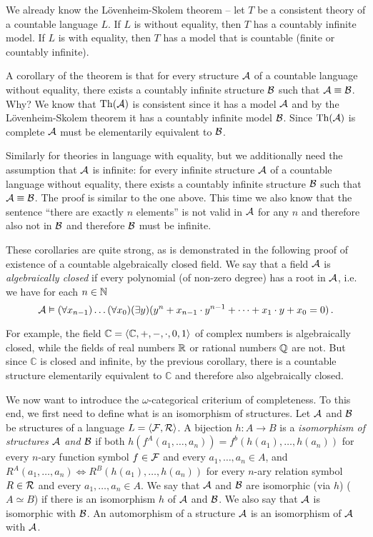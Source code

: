 We already know the Lövenheim-Skolem theorem -- let $T$ be a consistent theory of a countable language $L$. If $L$ is without equality, then $T$ has a countably infinite model. If $L$ is with equality, then $T$ has a model that is countable (finite or countably infinite). 

A corollary of the theorem is that for every structure $\mathcal{A}$ of a countable language without equality, there exists a countably infinite structure $\mathcal{B}$ such that $\mathcal{A} \equiv \mathcal{B}$. Why? We know that $\operatorname{Th}(\mathcal{A})$ is consistent since it has a model $\mathcal{A}$ and by the Lövenheim-Skolem theorem it has a countably infinite model $\mathcal{B}$. Since $\operatorname{Th}(\mathcal{A})$ is complete $\mathcal{A}$ must be elementarily equivalent to $\mathcal{B}$.

Similarly for theories in language with equality, but we additionally need the assumption that $\mathcal{A}$ is infinite: for every infinite structure $\mathcal{A}$ of a countable language without equality, there exists a countably infinite structure $\mathcal{B}$ such that $\mathcal{A} \equiv \mathcal{B}$. The proof is similar to the one above. This time we also know that the sentence ``there are exactly $n$ elements'' is not valid in $\mathcal{A}$ for any $n$ and therefore also not in $\mathcal{B}$ and therefore $\mathcal{B}$ must be infinite.

These corollaries are quite strong, as is demonstrated in the following proof of existence of a countable algebraically closed field. We say that a field $\mathcal{A}$ is \emph{algebraically closed} if every polynomial (of non-zero degree) has a root in $\mathcal{A}$, i.e. we have for each $n \in \mathbb{N}$ $$\mathcal{A} \vDash (\forall x_{n-1})\dots(\forall x_0)(\exists y)(y^n + x_{n-1}\cdot y^{n-1} + \dots + x_1\cdot y + x_0 = 0)\,.$$

For example, the field $\mathbb{C} = \langle \mathbb{C}, +, -, \cdot, 0, 1 \rangle$ of complex numbers is algebraically closed, while the fields of real numbers ${\mathbb{R}}$ or rational numbers $\mathbb{Q}$ are not. But since $\mathbb{C}$ is closed and infinite, by the previous corollary, there is a countable structure elementarily equivalent to $\mathbb{C}$ and therefore also algebraically closed.

We now want to introduce the $\omega$-categorical criterium of completeness. To this end, we first need to define what is an isomorphism of structures. Let $\mathcal{A}$ and $\mathcal{B}$ be structures of a language $L = \langle \mathcal{F}, \mathcal{R} \rangle$. A bijection $h: A \to B$ is a \emph{isomorphism of structures $\mathcal{A}$ and $\mathcal{B}$} if both $h(f^A(a_1, \dots, a_n)) = f^b(h(a_1), \dots, h(a_n))$ for every $n$-ary function symbol $f \in \mathcal{F}$ and every $a_1, \dots, a_n \in A$, and $R^A(a_1, \dots, a_n) \Leftrightarrow R^B(h(a_1), \dots, h(a_n))$ for every $n$-ary relation symbol $R \in \mathcal{R}$ and every $a_1, \dots, a_n \in A$. We say that $\mathcal{A}$ and $\mathcal{B}$ are isomorphic (via $h$) ($A \simeq B$) if there is an isomorphism $h$ of $\mathcal{A}$ and $\mathcal{B}$. We also say that $\mathcal{A}$ is isomorphic with $\mathcal{B}$. An automorphism of a structure $\mathcal{A}$ is an isomorphism of $\mathcal{A}$ with $\mathcal{A}$. 

